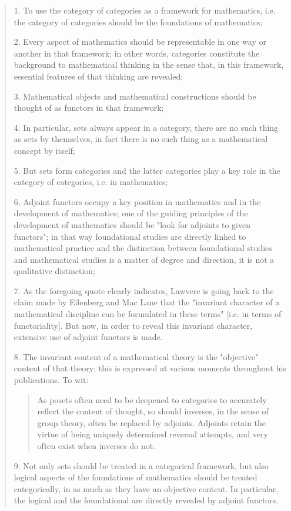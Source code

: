 \begin{quote}
   1. To use the category of categories as a framework for mathematics,
   i.e. the category of categories should be the foundations of
   mathematics;

   2. Every aspect of mathematics should be representable in one way or
   another in that framework; in other words, categories constitute the
   background to mathematical thinking in the sense that, in this
   framework, essential features of that thinking are revealed;

   3. Mathematical objects and mathematical constructions should be
   thought of as functors in that framework;

   4. In particular, sets always appear in a category, there are no
   such thing as sets by themselves, in fact there is no such thing as
   a mathematical concept by itself;

   5. But sets form categories and the latter categories play a key role
   in the category of categories, i.e. in mathematics;

   6. Adjoint functors occupy a key position in mathematics and in the
   development of mathematics; one of the guiding principles of the
   development of mathematics should be "look for adjoints to given
   functors"; in that way foundational studies are directly linked to
   mathematical practice and the distinction between foundational
   studies and mathematical studies is a matter of degree and
   direction, it is not a qualitative distinction;

   7. As the foregoing quote clearly indicates, Lawvere is going back
   to the claim made by Eilenberg and Mac Lane that the "invariant
   character of a mathematical discipline can be formulated in these
   terms" [i.e. in terms of functoriality]. But now, in order to
   reveal this invariant character, extensive use of adjoint functors
   is made. 

   8. The invariant content of a mathematical theory is the
   "objective" content of that theory; this is expressed at various
   moments throughout his publications.  To wit: 

\begin{quote}
      As posets often need to be deepened to categories to accurately
      reflect the content of thought, so should inverses, in the sense
      of group theory, often be replaced by adjoints. Adjoints retain
      the virtue of being uniquely determined reversal attempts, and 
      very often exist when inverses do not.
\end{quote}

   9. Not only sets should be treated in a categorical framework, but
   also logical aspects of the foundations of mathematics should be
   treated categorically, in as much as they have an objective
   content. In particular, the logical and the foundational are
   directly revealed by adjoint functors.
\end{quote}

